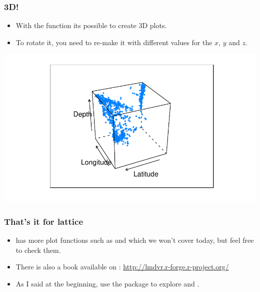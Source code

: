 \begin{frame}
  \frametitle{3D!}
  \begin{itemize}
  \item With the  function its possible to create 3D plots. 
  \item To rotate it, you need to re-make it with different values for the $x$, $y$ and $z$.
  \end{itemize}
\begin{Schunk}
\end{Schunk}
\includegraphics{plots/fig-024}
\end{frame}

\begin{frame}[allowframebreaks]
  \frametitle{That's it for lattice}
  \begin{itemize}
  \item {} has more plot functions such as  and  which we won't cover today, but feel free to check them.
  \item There is also a book available on : \url{http://lmdvr.r-forge.r-project.org/}
  \item As I said at the beginning, use the \alert{} package to explore  and .
  \end{itemize}
\end{frame}

